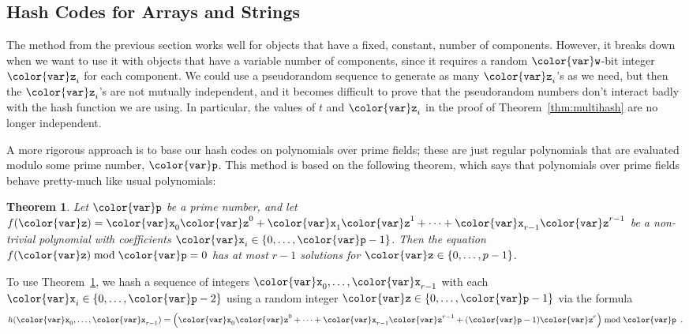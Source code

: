\documentclass[10pt]{book}
\newcommand{\seclabel}[1]{\label{sec:#1}}
\theoremstyle{plain}
\newtheorem{thm}{Theorem}[chapter]
\newcommand{\thmlabel}[1]{\label{thm:#1}}
\newcommand{\thmref}[1]{Theorem~\ref{thm:#1}}
\theoremstyle{definition}
\begin{document}
%
%
\subsection{Hash Codes for Arrays and Strings}
\seclabel{polyhash}

The method from the previous section works well for objects that have a
fixed, constant, number of components.  However, it breaks down when we
want to use it with objects that have a variable number of components,
since it requires a random \ensuremath{\mathtt{{\color{var}w}}}-bit integer $\ensuremath{\mathtt{{\color{var}z}}}_i$ for each component.
We could use a pseudorandom sequence to generate as many $\ensuremath{\mathtt{{\color{var}z}}}_i$'s as we
need, but then the $\ensuremath{\mathtt{{\color{var}z}}}_i$'s are not mutually independent, and it becomes
difficult to prove that the pseudorandom numbers don't interact badly
with the hash function we are using.  In particular, the values of $t$
and $\ensuremath{\mathtt{{\color{var}z}}}_i$ in the proof of \thmref{multihash} are no longer independent.

%
A more rigorous approach is to base our hash codes on polynomials over
prime fields;  these are just regular polynomials that are evaluated
modulo some prime number, \ensuremath{\mathtt{{\color{var}p}}}. This method is based on the following
theorem, which says that polynomials over prime fields behave pretty-much
like usual polynomials:

\begin{thm}\thmlabel{prime-polynomial}
 Let $\ensuremath{\mathtt{{\color{var}p}}}$ be a prime number, and let $f(\ensuremath{\mathtt{{\color{var}z}}}) = \ensuremath{\mathtt{{\color{var}x}}}_0\ensuremath{\mathtt{{\color{var}z}}}^0 + \ensuremath{\mathtt{{\color{var}x}}}_1\ensuremath{\mathtt{{\color{var}z}}}^1 +
 \cdots + \ensuremath{\mathtt{{\color{var}x}}}_{r-1}\ensuremath{\mathtt{{\color{var}z}}}^{r-1}$ be a non-trivial polynomial with coefficients
 $\ensuremath{\mathtt{{\color{var}x}}}_i\in\{0,\ldots,\ensuremath{\mathtt{{\color{var}p}}}-1\}$. Then the equation $f(\ensuremath{\mathtt{{\color{var}z}}})\bmod \ensuremath{\mathtt{{\color{var}p}}} = 0$
 has at most $r-1$ solutions for $\ensuremath{\mathtt{{\color{var}z}}}\in\{0,\ldots,p-1\}$.
\end{thm}

To use \thmref{prime-polynomial}, we hash a sequence of integers
$\ensuremath{\mathtt{{\color{var}x}}}_0,\ldots,\ensuremath{\mathtt{{\color{var}x}}}_{r-1}$ with each $\ensuremath{\mathtt{{\color{var}x}}}_i\in \{0,\ldots,\ensuremath{\mathtt{{\color{var}p}}}-2\}$ using
a random integer $\ensuremath{\mathtt{{\color{var}z}}}\in\{0,\ldots,\ensuremath{\mathtt{{\color{var}p}}}-1\}$ via the formula
\[
   h(\ensuremath{\mathtt{{\color{var}x}}}_0,\ldots,\ensuremath{\mathtt{{\color{var}x}}}_{r-1}) 
    = \left(\ensuremath{\mathtt{{\color{var}x}}}_0\ensuremath{\mathtt{{\color{var}z}}}^0+\cdots+\ensuremath{\mathtt{{\color{var}x}}}_{r-1}\ensuremath{\mathtt{{\color{var}z}}}^{r-1}+(\ensuremath{\mathtt{{\color{var}p}}}-1)\ensuremath{\mathtt{{\color{var}z}}}^r \right)\bmod \ensuremath{\mathtt{{\color{var}p}}} \enspace .
\]
\end{document}
